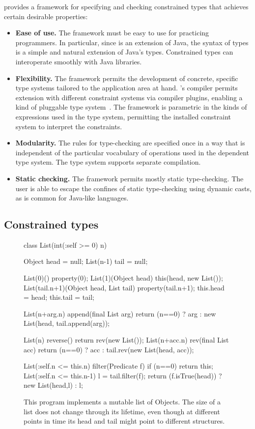 \Xten{} provides a framework for specifying and checking constrained types
that achieves certain desirable properties:
\begin{itemize}
\item 
{\bf Ease of use.}  The framework must be easy to use for practicing
programmers. In particular, since \Xten{} is an extension of Java,
the syntax of types is a simple and
natural extension of Java's types.  Constrained types can
interoperate smoothly with Java libraries.

\item
{\bf Flexibility.}
The framework
permits the development of concrete,
specific type systems tailored to the application area at
hand.  \Xten{}'s compiler permits extension with different constraint systems
via compiler plugins, enabling a kind of pluggable type system~\cite{bracha04-pluggable}.
The framework is parametric in the kinds of
expressions used in the type system, permitting the installed constraint
system to interpret the constraints.

\item
{\bf Modularity.}
The rules for type-checking
are specified once in a way that is independent of the
particular vocabulary of operations used in the dependent type
system.
The type system supports separate compilation.

\item
{\bf Static checking.}  The framework permits mostly static
type-checking. The user is able to escape the confines of
static type-checking using dynamic casts, as is common for Java-like
languages.
\end{itemize}

\subsection{Constrained types}

\begin{figure}[t!]
\begin{xten}
class List(int(:self >= 0) n) {
  Object head = null;
  List(n-1) tail = null;

  List(0)() { property(0); }
  List(1)(Object head) { this(head, new List());}
  List(tail.n+1)(Object head, List tail) {
    property(tail.n+1);
    this.head = head;
    this.tail = tail;
  }

  List(n+arg.n) append(final List arg) {
    return (n==0) ? arg : new List(head, tail.append(arg));
  }

  List(n) reverse() { return rev(new List()); }
  List(n+acc.n) rev(final List acc) {
    return (n==0) ? acc : tail.rev(new List(head, acc));
  }

  List(:self.n <= this.n) filter(Predicate f) {
    if (n==0) return this;
    List(:self.n <= this.n-1) l = tail.filter(f);
    return (f.isTrue(head)) ? new List(head,l) : l;
  }
}
\end{xten}
\caption{
This program implements a mutable list of Objects. The size of a list
does not change through its lifetime, even though at different points
in time its head and tail might point to different structures.}
\label{fig:list-example}
\end{figure}

